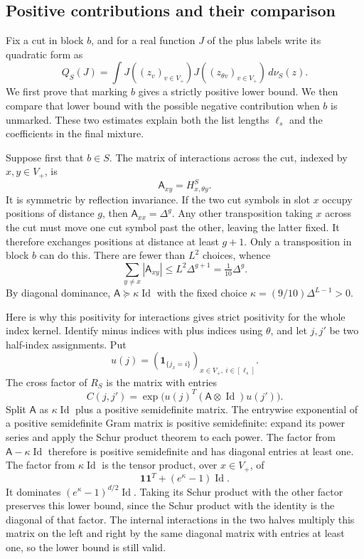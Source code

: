 \subsection{Positive contributions and their comparison}

Fix a cut in block $b$, and for a real function $J$ of the plus labels
write its quadratic form as
\[
 Q_S(J)=\int J((z_v)_{v\in V_+})
             J((z_{\theta v})_{v\in V_+})\,d\nu_S(z).
\]
We first prove that marking $b$ gives a strictly positive lower bound.
We then compare that lower bound with the possible negative contribution
when $b$ is unmarked.  These two estimates explain both the list lengths
$\ell_s$ and the coefficients in the final mixture.

Suppose first that $b\in S$.  The matrix of interactions across the cut,
indexed by $x,y\in V_+$, is
\[
 \mathsf A_{xy}=H^S_{x,\theta y}.
\]
It is symmetric by reflection invariance.  If the two cut symbols in
slot $x$ occupy positions of distance $g$, then
$\mathsf A_{xx}=\Delta^g$.  Any other transposition taking $x$ across
the cut must move one cut symbol past the other, leaving the latter
fixed.  It therefore exchanges positions at distance at least $g+1$.
Only a transposition in block $b$ can do this.  There are fewer than
$L^2$ choices, whence
\[
 \sum_{y\ne x}|\mathsf A_{xy}|\le L^2\Delta^{g+1}
       =\tfrac1{10}\Delta^g.
\]
By diagonal dominance,
$\mathsf A\succeq\kappa\operatorname{Id}$ with the fixed choice
$\kappa=(9/10)\Delta^{L-1}>0$.

Here is why this positivity for interactions gives strict positivity for
the whole index kernel.  Identify minus indices with plus indices using
$\theta$, and let $j,j'$ be two half-index assignments.  Put
\[
 u(j)=(\mathbf1_{\{j_x=i\}})_{x\in V_+,\ i\in[\ell_s]}.
\]
The cross factor of $R_S$ is the matrix with entries
\[
 C(j,j')=\exp\bigl(u(j)^T(\mathsf A\otimes\operatorname{Id})u(j')\bigr).
\]
Split $\mathsf A$ as $\kappa\operatorname{Id}$ plus a positive
semidefinite matrix.  The entrywise exponential of a positive
semidefinite Gram matrix is positive semidefinite: expand its power
series and apply the Schur product theorem to each power.  The factor
from $\mathsf A-\kappa\operatorname{Id}$ therefore is positive
semidefinite and has diagonal entries at least one.  The factor from
$\kappa\operatorname{Id}$ is the tensor product, over $x\in V_+$, of
\[
 \mathbf1\mathbf1^T+(e^\kappa-1)\operatorname{Id}.
\]
It dominates $(e^\kappa-1)^{d/2}\operatorname{Id}$.  Taking its Schur
product with the other factor preserves this lower bound, since the
Schur product with the identity is the diagonal of that factor.
The internal interactions in the two halves multiply this matrix on
the left and right by the same diagonal matrix with entries at least one,
so the lower bound is still valid.

